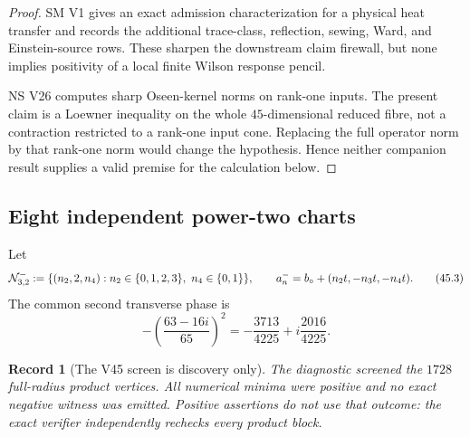 \documentclass[11pt,oneside]{article}
\newtheorem{record}[theorem]{Record}
\theoremstyle{definition}
\theoremstyle{remark}
\begin{document}
\begin{proof}
SM V1 gives an exact admission characterization for a physical heat
transfer and records the additional trace-class, reflection,
sewing, Ward, and Einstein-source rows.  These sharpen the
downstream claim firewall, but none implies positivity of a local
finite Wilson response pencil.

NS V26 computes sharp Oseen-kernel norms on rank-one inputs.  The
present claim is a Loewner inequality on the whole
\(45\)-dimensional reduced fibre, not a contraction restricted to a
rank-one input cone.  Replacing the full operator norm by that
rank-one norm would change the hypothesis.  Hence neither companion
result supplies a valid premise for the calculation below.
\end{proof}

\subsection{Eight independent power-two charts}

Let
\[
 {\cal N}_{3,2}^{-}:=
 \{(n_2,2,n_4):n_2\in\{0,1,2,3\},\ n_4\in\{0,1\}\},
\qquad
 a_n^-=b_\circ+(n_2t,-n_3t,-n_4t).                   \tag{45.3}
\]
The common second transverse phase is
\[
 -\left(\frac{63-16i}{65}\right)^2
 =-\frac{3713}{4225}+i\frac{2016}{4225}.              \tag{45.4}
\]

\begin{record}[The V45 screen is discovery only]
\label{rec:newv45-screen}
The diagnostic screened the \(1728\) full-radius product vertices.
All numerical minima were positive and no exact negative witness
was emitted.  Positive assertions do not use that outcome: the
exact verifier independently rechecks every product block.
\end{record}
\end{document}
